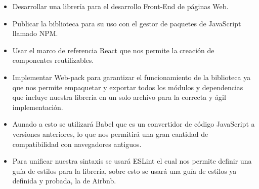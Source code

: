   \begin{itemize}
 \item Desarrollar una librería para el desarrollo Front-End de páginas Web.
 \item Publicar la biblioteca para su uso con el gestor de paquetes de JavaScript \cite{javascript} llamado NPM.
 \item Usar el marco de referencia React que nos permite la creación de componentes reutilizables.
 \item Implementar Web-pack para garantizar el funcionamiento de la biblioteca ya que nos permite empaquetar y exportar todos los módulos y dependencias que incluye nuestra librería en un solo archivo para la correcta y ágil implementación. 
 \item Aunado a esto se utilizará Babel \cite{babel} que es un convertidor de código JavaScript a versiones anteriores, lo que nos permitirá una gran cantidad de compatibilidad con navegadores antiguos. 
 \item Para unificar nuestra sintaxis se usará ESLint el cual nos permite definir una guía de estilos para la librería, sobre esto se usará una guía de estilos ya definida y probada, la de Airbnb. 
   \end{itemize}
\newpage

